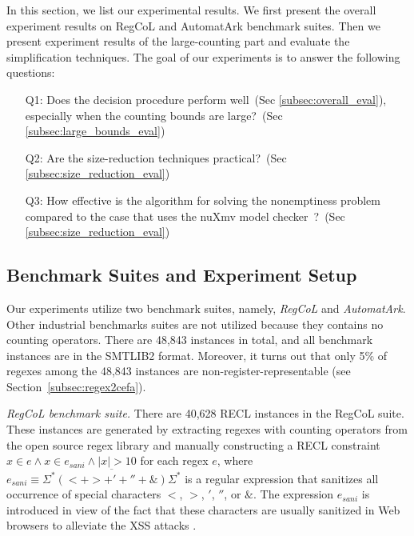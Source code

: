 In this section, we list our experimental results. We first present the overall experiment results on RegCoL and AutomatArk benchmark suites. Then we present experiment results of the large-counting part and evaluate the simplification techniques. The goal of our experiments is to answer the following questions:
\begin{itemize}
  \item [Q1:] Does the decision procedure perform well~(Sec \ref{subsec:overall_eval}), especially when the counting bounds are large?~(Sec \ref{subsec:large_bounds_eval})
  \item [Q2:] Are the size-reduction techniques practical?~(Sec \ref{subsec:size_reduction_eval})
  \item [Q3:] How effective is the algorithm for solving the nonemptiness problem compared to the case that uses the nuXmv model checker~\cite{atva2020}?~(Sec \ref{subsec:size_reduction_eval})
\end{itemize}



\subsection{Benchmark Suites and Experiment Setup}\label{sec:bench}

Our experiments utilize two benchmark suites, namely, \emph{RegCoL} and \emph{AutomatArk}. Other industrial benchmarks suites are not utilized because they contains no counting operators. There are 48,843 instances in total, and all benchmark instances are in the SMTLIB2 format.
Moreover, it turns out that only 5\% of regexes among the 48,843 instances are non-register-representable (see Section~\ref{subsec:regex2cefa}).

\medskip
\noindent
\emph{RegCoL benchmark suite.} There are 40,628 RECL instances in the RegCoL suite. These instances are generated by extracting regexes with counting operators from the open source regex library \cite{regex_lingua_franca,redos_lenka} and manually constructing a RECL constraint $x \in e \wedge x \in e_{sani} \wedge |x| > 10$ for each regex $e$,
where $e_{sani} \equiv \overline{\Sigma^*(<+ >+'+''+\&)\Sigma^*}$ is a regular expression that sanitizes all occurrence of special characters $<$, $>$, $'$, $''$, or $\&$. 
The expression $e_{sani}$ is introduced in view of the fact that these characters are usually sanitized in Web browsers to alleviate the XSS attacks \cite{malware_detection_3_kudzu,CCH_18}.

